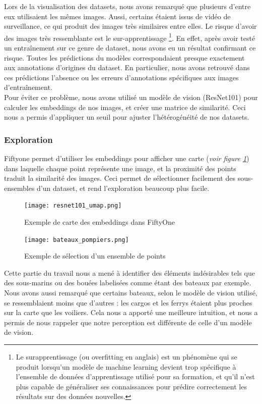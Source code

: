 Lors de la visualisation des datasets, nous avons remarqué que plusieurs d'entre eux utilisaient les
mêmes images. Aussi, certains étaient issus de vidéo de surveillance, ce qui produit des images
très similaires entre elles. Le risque d'avoir des images très ressemblante est le sur-apprentissage
\footnote{Le surapprentissage (ou overfitting en anglais) est un phénomène qui se produit
lorsqu'un modèle de machine learning devient trop spécifique à l'ensemble de données d'apprentissage
utilisé pour sa formation, et qu'il n'est plus capable de généraliser ses connaissances
pour prédire correctement les résultats sur des données nouvelles.}. En effet, après avoir testé un entraînement sur ce genre de dataset, nous avons eu un résultat confirmant ce risque. Toutes les prédictions du modèles correspondaient presque exactement aux annotations d'origines du dataset. En particulier, nous avons retrouvé dans ces prédictions l'absence ou les erreurs d'annotations spécifiques aux images d'entraînement.\\

Pour éviter ce problème, nous avons utilisé un modèle de vision (ResNet101) pour calculer les embeddings de nos images,
et créer une matrice de similarité. Ceci nous a permis d'appliquer un seuil pour ajuster l'hétérogénéité
de nos datasets.

\subsubsection{Exploration}

Fiftyone permet d'utiliser les embeddings pour afficher une carte (\textit{voir figure \ref{carte_similarite}})
    dans laquelle chaque point représente
une image, et la proximité des points traduit la similarité des images.
Ceci permet de sélectionner facilement des sous-ensembles d'un dataset, et rend l'exploration beaucoup
plus facile.

\begin{figure}[H]
    \centering
    \texttt{[image: resnet101\_umap.png]}
    \caption{Exemple de carte des embeddings dans FiftyOne}\label{carte_similarite}
\end{figure}

\begin{figure}[H]
    \centering
    \texttt{[image: bateaux\_pompiers.png]}
    \caption{Exemple de sélection d'un ensemble de points}
\end{figure}

Cette partie du travail nous a mené à identifier des éléments indésirables tels que des sous-marins ou
des bouées labelisées comme étant des bateaux par exemple. Nous avons aussi remarqué que certains bateaux,
selon le modèle de vision utilisé, se ressemblaient moins que d'autres : les cargos et les ferrys étaient
plus proches sur la carte que les voiliers. Cela nous a apporté une meilleure intuition, et nous a permis de nous rappeler que notre perception est différente de celle d'un modèle de vision.\\

